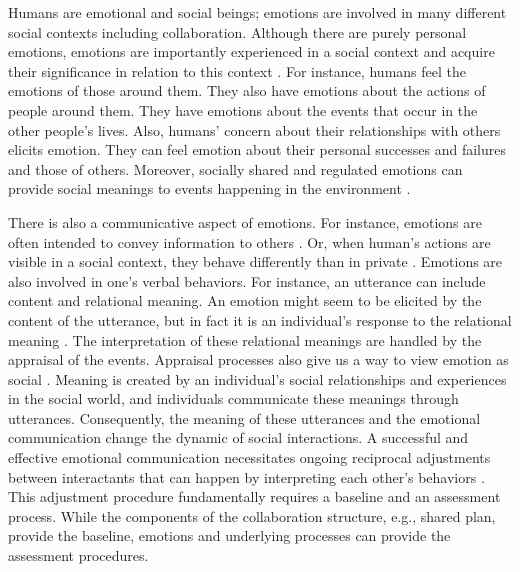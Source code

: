Humans are emotional and social beings; emotions are involved in many different
social contexts including collaboration. Although there are purely personal
emotions, emotions are importantly experienced in a social context and acquire
their significance in relation to this context
\cite{parkinson:emotion-social-interaction}. For instance, humans feel the
emotions of those around them. They also have emotions about the actions of
people around them. They have emotions about the events that occur in the other
people's lives. Also, humans' concern about their relationships with others
elicits emotion. They can feel emotion about their personal successes and
failures and those of others. Moreover, socially shared and regulated emotions
can provide social meanings to events happening in the environment
\cite{wisecup:sociology-emotions}. 

There is also a communicative aspect of emotions. For instance, emotions are
often intended to convey information to others \cite{goffman:self-presentation}.
Or, when human's actions are visible in a social context, they behave
differently than in private \cite{zajonc:social-facilitation}. Emotions are also
involved in one's verbal behaviors. For instance, an utterance can include
content and relational meaning. An emotion might seem to be elicited by the
content of the utterance, but in fact it is an individual's response to the
relational meaning \cite{planalp:communicating-emotion}. The interpretation of
these relational meanings are handled by the appraisal of the events. Appraisal
processes also give us a way to view emotion as social
\cite{hooft:sharing-emotions}. Meaning is created by an individual's social
relationships and experiences in the social world, and individuals communicate
these meanings through utterances. Consequently, the meaning of these utterances
and the emotional communication change the dynamic of social interactions. A
successful and effective emotional communication necessitates ongoing reciprocal
adjustments between interactants that can happen by interpreting each other's
behaviors \cite{parkinson:emotion-social-interaction}. This adjustment procedure
fundamentally requires a baseline and an assessment process. While the
components of the collaboration structure, e.g., shared plan, provide the
baseline, emotions and underlying processes can provide the assessment
procedures.

